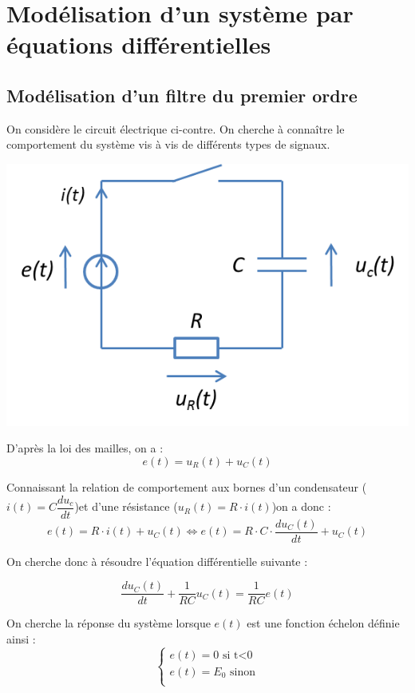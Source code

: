 \documentclass[10pt,fleqn]{article} %
\begin{document}
\section{Modélisation d'un système par équations différentielles}
\subsection{Modélisation d'un filtre du premier ordre}

\begin{minipage}[c]{.6\linewidth}
On considère le circuit électrique ci-contre. On cherche à connaître le comportement du système vis à vis de différents types de signaux.
\end{minipage}\hfill
\begin{minipage}[c]{.35\linewidth}
\begin{center}
\includegraphics[width=.9\textwidth]{images/RC}
\end{center}
\end{minipage}

D'après la loi des mailles, on a :
$$
e(t)=u_R(t) + u_C(t)
$$

Connaissant la relation de comportement aux bornes d'un condensateur ($i(t)=C\dfrac{du_c}{dt}$)et d'une résistance ($u_R(t)=R\cdot i(t)$)on a donc :
$$
e(t)=R\cdot i(t) +  u_C(t) 
\Longleftrightarrow e(t)=R\cdot C\cdot \dfrac{du_C(t)}{dt} +  u_C(t)
$$

On cherche donc à résoudre l'équation différentielle suivante : 

$$
\dfrac{du_C(t)}{dt} +  \dfrac{1}{RC}u_C(t) = \dfrac{1}{RC}e(t)
$$

On cherche la réponse du système lorsque $e(t)$ est une fonction échelon définie ainsi :
$$\left\{
\begin{array}{l}
e(t)=0 \text{ si t<0}\\
e(t)=E_0 \text{ sinon}\\
\end{array}
\right.
$$
\end{document}
